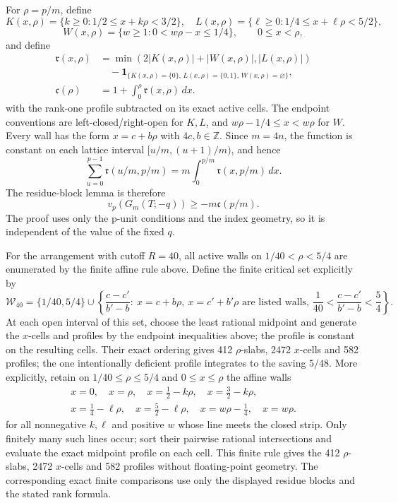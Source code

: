 For \(\rho=p/m\), define
\[
 K(x,\rho)=\{k\ge0:1/2\le x+k\rho<3/2\},\quad
 L(x,\rho)=\{\ell\ge0:1/4\le x+\ell\rho<5/2\},
\]
\[
 W(x,\rho)=\{w\ge1:0<w\rho-x\le1/4\},
\qquad 0\le x<\rho,
\]
and define
\[
\begin{aligned}
 \mathfrak r(x,\rho)
   &=\min(2|K(x,\rho)|+|W(x,\rho)|,|L(x,\rho)|)\\
   &\quad-\mathbf 1_{\{K(x,\rho)=\{0\},\,
       L(x,\rho)=\{0,1\},\,W(x,\rho)=\varnothing\}},\\
 \mathfrak c(\rho)&=1+\int_0^\rho\mathfrak r(x,\rho)\,dx .
\end{aligned}
\]
with the rank-one profile subtracted on its exact active cells.  The endpoint
conventions are left-closed/right-open for \(K,L\), and
\(w\rho-1/4\le x<w\rho\) for \(W\).  Every wall has the form
\(x=c+b\rho\) with \(4c,b\in\mathbb Z\).  Since \(m=4n\), the function is
constant on each lattice interval \([u/m,(u+1)/m)\), and hence
\[
 \sum_{u=0}^{p-1}\mathfrak r(u/m,p/m)
   =m\int_0^{p/m}\mathfrak r(x,p/m)\,dx.
\]
The residue-block lemma is therefore
\[
 v_p(G_m(T;-q))\ge -m\mathfrak c(p/m).
\]
The proof uses only the p-unit conditions and the index geometry, so it is
independent of the value of the fixed \(q\).

For the arrangement with cutoff $R=40$, all active walls on
\(1/40<\rho<5/4\) are enumerated by the finite affine rule above.  Define
the finite critical set explicitly by
\[
 \mathcal W_{40}=\{1/40,5/4\}\cup
 \left\{\frac{c-c'}{b'-b}:\ x=c+b\rho,\ x=c'+b'\rho
 \text{ are listed walls, }\frac1{40}<\frac{c-c'}{b'-b}<\frac54\right\}.
\]
At each open interval of this set, choose the least rational midpoint and
generate the $x$-cells and profiles by the endpoint inequalities above;
the profile is constant on the resulting cells.  Their
exact ordering gives 412 \(\rho\)-slabs, 2472 \(x\)-cells and 582 profiles;
the one intentionally deficient profile integrates to the saving \(5/48\).
More explicitly, retain on \(1/40\le\rho\le5/4\) and \(0\le x\le\rho\)
the affine walls
\[
\begin{gathered}
x=0,\quad x=\rho,\quad
x=\tfrac12-k\rho,\quad x=\tfrac32-k\rho,\\
x=\tfrac14-\ell\rho,\quad x=\tfrac52-\ell\rho,\quad
x=w\rho-\tfrac14,\quad x=w\rho .
\end{gathered}
\]
for all nonnegative \(k,\ell\) and positive \(w\) whose line meets the
closed strip.  Only finitely many such lines occur; sort their pairwise
rational intersections and evaluate the exact midpoint profile on each cell.
This finite rule gives the 412 \(\rho\)-slabs, 2472 \(x\)-cells and 582
profiles without floating-point geometry.
The corresponding exact finite comparisons use only the displayed residue
blocks and the stated rank formula.

